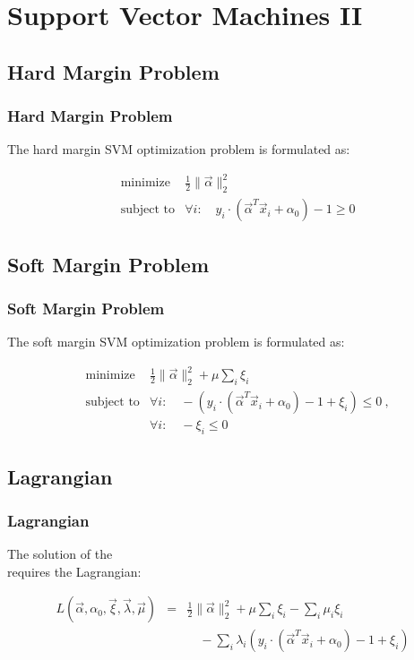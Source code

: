 \section{Support Vector Machines II}

\subsection{Hard Margin Problem}

\begin{frame}
  \frametitle{Hard Margin Problem}

  The hard margin SVM optimization problem is formulated as:

  \begin{eqnarray*}
    & \mbox{minimize}   & \frac{1}{2} {\|\vec \alpha\|^2_2} \\[.3cm]
    & \mbox{subject to} & \forall i: \quad y_i\cdot (\vec \alpha^T\vec x_i + \alpha_0) -1 \geq 0
  \end{eqnarray*}
\end{frame}


\subsection{Soft Margin Problem}

\begin{frame}
  \frametitle{Soft Margin Problem}
 
  The soft margin SVM optimization problem is formulated as:
  
  \begin{eqnarray*}
    & \mbox{minimize}   & \frac{1}{2} {\|\vec \alpha\|^2_2} + \mu \sum_i \xi_i \\[.5cm]
    & \mbox{subject to} & \forall i: \quad -(y_i\cdot (\vec \alpha^T\vec x_i + \alpha_0) -1+\xi_i) \leq 0~, \\[.3cm]
    &                   & \forall i: \quad -\xi_i \leq 0
  \end{eqnarray*}
\end{frame}


\subsection{Lagrangian}

\begin{frame}
  \frametitle{Lagrangian}

  The solution of the  \\
  requires the Lagrangian:
 
  \begin{eqnarray*}
    L(\vec \alpha, \alpha_0, \vec \xi, \vec \lambda, \vec \mu)
     & = & \frac{1}{2} {\|\vec \alpha\|^2_2} + \mu \sum_i \xi_i  -\sum_i \mu_i \xi_i\\
     &   & \quad - \sum_i \lambda_i (y_i\cdot (\vec \alpha^T\vec x_i + \alpha_0) -1+\xi_i)
  \end{eqnarray*}
\end{frame}


